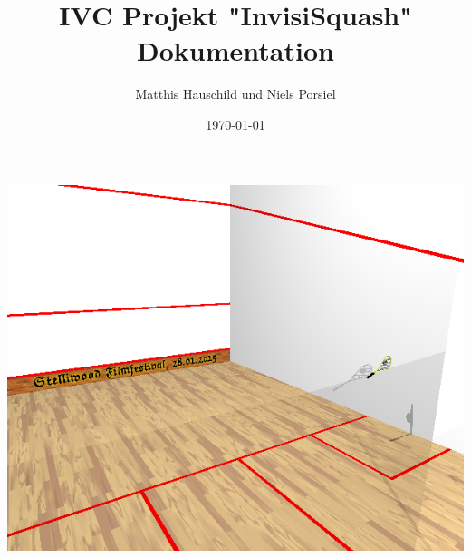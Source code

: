 \documentclass[12pt,a4paper,oneside,ngerman]{scrartcl}
\title{IVC Projekt "InvisiSquash" Dokumentation}
\author{Matthis Hauschild und Niels Porsiel}
\date{\today}
\begin{document}
	\maketitle
	\includegraphics[width=\linewidth]{images/titleimage.png}
	\vspace{\fill}
	
\end{document}
